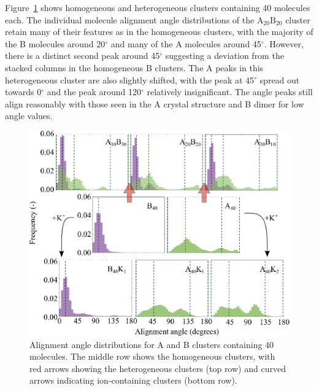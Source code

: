 Figure~\ref{fig:alignmentangles_hetero} shows homogeneous and heterogeneous clusters containing 40 molecules each. The individual molecule alignment angle distributions of the $\text{A}_{\text{20}}\text{B}_{\text{20}}$ cluster retain many of their features as in the homogeneous clusters, with the majority of the B molecules around 20$^{\circ}$ and many of the A molecules around 45$^{\circ}$.  However, there is a distinct second peak around 45$^{\circ}$ suggesting a deviation from the stacked columns in the homogeneous B clusters. The A peaks in this heterogeneous cluster are also slightly shifted, with the peak at 45$^{\circ}$ spread out towards 0$^{\circ}$ and the peak around 120$^{\circ}$ relatively insignificant. The angle peaks still align reasonably with those seen in the A crystal structure and B dimer for low angle values. %
%
\begin{figure}[!tbh]
\centering
\includegraphics[width=0.7\linewidth]{Figures/alignment_angles_hetero.eps}
\caption{Alignment angle distributions for A and B clusters containing 40 molecules. The middle row shows the homogeneous clusters, with red arrows showing the heterogeneous clusters (top row) and curved arrows indicating ion-containing clusters (bottom row).}
\label{fig:alignmentangles_hetero}
\end{figure}
%

